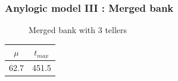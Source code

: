 \documentclass[10pt]{beamer}
\begin{document}
\begin{frame}
  \frametitle{Anylogic model III : Merged bank}
\begin{figure}
\centering
{}
\caption{Merged bank with 3 tellers}
\end{figure}

\begin{table}
\centering
\begin{tabular}{|c|c|}
\hline
$\mu$ & $t_{max}$ \\
\hline
62.7 & 451.5 \\
\hline
\end{tabular} 
\end{table}

\end{frame}
\end{document}
